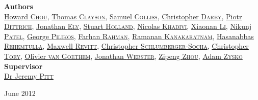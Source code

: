 \begin{titlepage}
\begin{center}
\textbf{Authors}\\
\vspace{5pt}
\href{mailto:howard.chou09@imperial.ac.uk}{Howard \textsc{Chou}}, 
\href{mailto:thomas.clayson08@imperial.ac.uk}{Thomas \textsc{Clayson}},
\href{mailto:samuel.colliss09@imperial.ac.uk}{Samuel \textsc{Colliss}}, 
\href{mailto:christopher.darby08@imperial.ac.uk}{Christopher \textsc{Darby}}, 
\href{mailto:piotr.dittrich09@imperial.ac.uk}{Piotr \textsc{Dittrich}}, 
\href{mailto:jonathan.ely09@imperial.ac.uk}{Jonathan \textsc{Ely}}, 
\href{mailto:stuart.holland09@imperial.ac.uk}{Stuart \textsc{Holland}}, 
\href{mailto:nicolas.khadivi09@imperial.ac.uk}{Nicolas \textsc{Khadivi}}, 
\href{mailto:xiaonan.li08@imperial.ac.uk}{Xiaonan \textsc{Li}}, 
\href{mailto:nikunj.patel09@imperial.ac.uk}{Nikunj \textsc{Patel}},
\href{mailto:george.pilikos08@imperial.ac.uk}{George \textsc{Pilikos}}, 
\href{mailto:farhan.rahman09@imperial.ac.uk}{Farhan \textsc{Rahman}}, 
\href{mailto:kanakaratnam.ramanan09@imperial.ac.uk}{Ramanan \textsc{Kanakaratnam}}, 
\href{mailto:hasanabbas.rehemtulla09@imperial.ac.uk}{Hasanabbas \textsc{Rehemtulla}}, 
\href{mailto:maxwell.revitt09@imperial.ac.uk}{Maxwell \textsc{Revitt}}, 
\href{mailto:chris.socha09@imperial.ac.uk}{Christopher \textsc{Schlumberger-Socha}}, 
\href{mailto:christopher.tory09@imperial.ac.uk}{Christopher \textsc{Tory}}, 
\href{mailto:olivier.van-goethem09@imperial.ac.uk}{Olivier \textsc{van Goethem}}, 
\href{mailto:jonathan.webster08@imperial.ac.uk}{Jonathan \textsc{Webster}}, 
\href{mailto:zipeng.zhou08@imperial.ac.uk}{Zipeng \textsc{Zhou}}, 
\href{mailto:adam.zysko09@imperial.ac.uk}{Adam \textsc{Zysko}} \\ \vfill
\textbf{Supervisor} \\
\vspace{5pt}
\href{mailto:j.pitt@imperial.ac.uk}{Dr Jeremy \textsc{Pitt}}


\vfill

{\large June 2012}

\end{center}
\end{titlepage}

